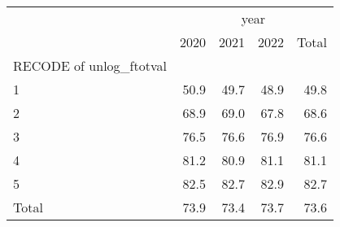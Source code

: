 \begin{tabular}{lllll}
\cline{1-5}
\multicolumn{1}{c}{} &
  \multicolumn{4}{|c}{year} \\
\multicolumn{1}{c}{} &
  \multicolumn{1}{|r}{2020} &
  \multicolumn{1}{r}{2021} &
  \multicolumn{1}{r}{2022} &
  \multicolumn{1}{r}{Total} \\
\cline{1-5}
\multicolumn{1}{l}{RECODE of unlog\_ftotval} &
  \multicolumn{1}{|r}{} &
  \multicolumn{1}{r}{} &
  \multicolumn{1}{r}{} &
  \multicolumn{1}{r}{} \\
\multicolumn{1}{l}{\hspace{1em}1} &
  \multicolumn{1}{|r}{50.9} &
  \multicolumn{1}{r}{49.7} &
  \multicolumn{1}{r}{48.9} &
  \multicolumn{1}{r}{49.8} \\
\multicolumn{1}{l}{\hspace{1em}2} &
  \multicolumn{1}{|r}{68.9} &
  \multicolumn{1}{r}{69.0} &
  \multicolumn{1}{r}{67.8} &
  \multicolumn{1}{r}{68.6} \\
\multicolumn{1}{l}{\hspace{1em}3} &
  \multicolumn{1}{|r}{76.5} &
  \multicolumn{1}{r}{76.6} &
  \multicolumn{1}{r}{76.9} &
  \multicolumn{1}{r}{76.6} \\
\multicolumn{1}{l}{\hspace{1em}4} &
  \multicolumn{1}{|r}{81.2} &
  \multicolumn{1}{r}{80.9} &
  \multicolumn{1}{r}{81.1} &
  \multicolumn{1}{r}{81.1} \\
\multicolumn{1}{l}{\hspace{1em}5} &
  \multicolumn{1}{|r}{82.5} &
  \multicolumn{1}{r}{82.7} &
  \multicolumn{1}{r}{82.9} &
  \multicolumn{1}{r}{82.7} \\
\multicolumn{1}{l}{\hspace{1em}Total} &
  \multicolumn{1}{|r}{73.9} &
  \multicolumn{1}{r}{73.4} &
  \multicolumn{1}{r}{73.7} &
  \multicolumn{1}{r}{73.6} \\
\cline{1-5}
\end{tabular}
